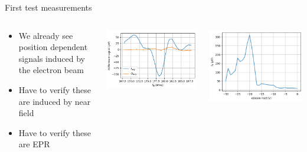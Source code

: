 \documentclass[final]{beamer}
\begin{document}
\begin{frame}[fragile]{}
\begin{columns}[T]
\begin{column}{.49\linewidth}
	\begin{block}{\Large First test measurements}
		\begin{columns}
			\begin{column}{0.33\columnwidth}
				\begin{itemize}
					\item We already see position dependent signals induced by the electron beam
					\item Have to verify these are induced by near field
					\item Have to verify these are EPR
				\end{itemize}
			\end{column}
			\begin{column}{0.33\columnwidth}
				\includegraphics[width=\columnwidth]{./figures/signalsample.png}
			\end{column}
			\begin{column}{0.33\columnwidth}
				\includegraphics[width=\columnwidth]{./figures/signaldependence.png}
			\end{column}
		\end{columns}
	\end{block}


\end{column}
\end{columns}
\end{frame}
\end{document}

